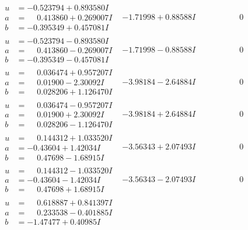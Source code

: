\documentclass[1p]{elsarticle_modified}
\theoremstyle{definition}
\begin{document}
$$\begin{array}{c|c|c}
\begin{aligned}
u &= -0.523794 + 0.893580 I \\
a &= \phantom{-}0.413860 + 0.269007 I \\
b &= -0.395349 + 0.457081 I\end{aligned}
 & -1.71998 + 0.88588 I & \phantom{-0.000000 } 0 \\ \hline\begin{aligned}
u &= -0.523794 - 0.893580 I \\
a &= \phantom{-}0.413860 - 0.269007 I \\
b &= -0.395349 - 0.457081 I\end{aligned}
 & -1.71998 - 0.88588 I & \phantom{-0.000000 } 0 \\ \hline\begin{aligned}
u &= \phantom{-}0.036474 + 0.957207 I \\
a &= \phantom{-}0.01900 - 2.30092 I \\
b &= \phantom{-}0.028206 + 1.126470 I\end{aligned}
 & -3.98184 - 2.64884 I & \phantom{-0.000000 } 0 \\ \hline\begin{aligned}
u &= \phantom{-}0.036474 - 0.957207 I \\
a &= \phantom{-}0.01900 + 2.30092 I \\
b &= \phantom{-}0.028206 - 1.126470 I\end{aligned}
 & -3.98184 + 2.64884 I & \phantom{-0.000000 } 0 \\ \hline\begin{aligned}
u &= \phantom{-}0.144312 + 1.033520 I \\
a &= -0.43604 + 1.42034 I \\
b &= \phantom{-}0.47698 - 1.68915 I\end{aligned}
 & -3.56343 + 2.07493 I & \phantom{-0.000000 } 0 \\ \hline\begin{aligned}
u &= \phantom{-}0.144312 - 1.033520 I \\
a &= -0.43604 - 1.42034 I \\
b &= \phantom{-}0.47698 + 1.68915 I\end{aligned}
 & -3.56343 - 2.07493 I & \phantom{-0.000000 } 0 \\ \hline\begin{aligned}
u &= \phantom{-}0.618887 + 0.841397 I \\
a &= \phantom{-}0.233538 - 0.401885 I \\
b &= -1.47477 + 0.40985 I\end{aligned}

\end{array}$$
\end{document}
